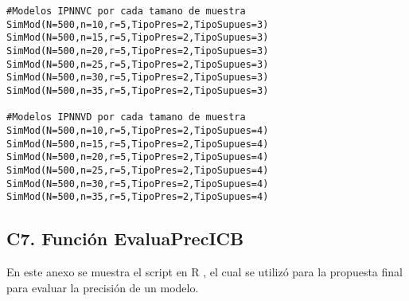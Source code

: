\begin{verbatim}
#Modelos IPNNVC por cada tamano de muestra
SimMod(N=500,n=10,r=5,TipoPres=2,TipoSupues=3)
SimMod(N=500,n=15,r=5,TipoPres=2,TipoSupues=3)
SimMod(N=500,n=20,r=5,TipoPres=2,TipoSupues=3)
SimMod(N=500,n=25,r=5,TipoPres=2,TipoSupues=3)
SimMod(N=500,n=30,r=5,TipoPres=2,TipoSupues=3)
SimMod(N=500,n=35,r=5,TipoPres=2,TipoSupues=3)

#Modelos IPNNVD por cada tamano de muestra
SimMod(N=500,n=10,r=5,TipoPres=2,TipoSupues=4)
SimMod(N=500,n=15,r=5,TipoPres=2,TipoSupues=4)
SimMod(N=500,n=20,r=5,TipoPres=2,TipoSupues=4)
SimMod(N=500,n=25,r=5,TipoPres=2,TipoSupues=4)
SimMod(N=500,n=30,r=5,TipoPres=2,TipoSupues=4)
SimMod(N=500,n=35,r=5,TipoPres=2,TipoSupues=4)
\end{verbatim}



\newpage
\subsection*{C7. Función EvaluaPrecICB}

En este anexo se muestra el script en R \parencite{R-2024}, el cual se utilizó para la propuesta final para evaluar la precisión de un modelo.



